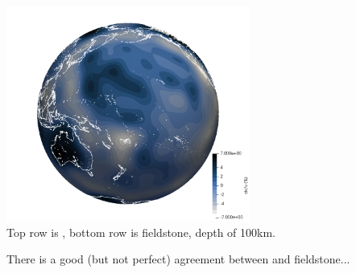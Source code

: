 \begin{center}
\includegraphics[width=8cm]{python_codes/fieldstone_85/aspect/fieldstone2}\\
{\captionfont Top row is \aspect{}, bottom row is fieldstone, depth of 100km.}
\end{center}

There is a good (but not perfect) agreement between \aspect{} and fieldstone...








